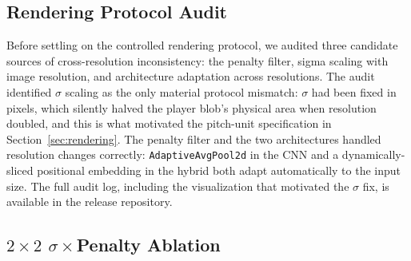 \documentclass[runningheads,a4paper]{llncs}
\begin{document}
\subsection{Rendering Protocol Audit}
\label{sec:rendering-audit}

Before settling on the controlled rendering protocol, we audited three
candidate sources of cross-resolution inconsistency: the penalty
filter, sigma scaling with image resolution, and architecture
adaptation across resolutions. The audit identified $\sigma$ scaling
as the only material protocol mismatch: $\sigma$ had been fixed in
pixels, which silently halved the player blob's physical area when
resolution doubled, and this is what motivated the pitch-unit
specification in Section~\ref{sec:rendering}. The penalty filter and
the two architectures handled resolution changes correctly:
\texttt{AdaptiveAvgPool2d} in the CNN and a dynamically-sliced
positional embedding in the hybrid both adapt automatically to the
input size. The full audit log, including the visualization that motivated the $\sigma$ fix, is available in the release repository.

\subsection{$2{\times}2$ $\sigma\times$Penalty Ablation}
\label{sec:2x2}

\begin{table}[t]
\centering
\caption{$2{\times}2$ $\sigma\times$penalty ablation at $64{\times}64$
($n{=}3$ per cell). \textbf{Penalty has near-zero main effect on PR-AUC;}
$\sigma$ has a positive average effect; the $\sigma\times$penalty
interaction is strong.}
\label{tab:2x2}
\end{table}
\end{document}
